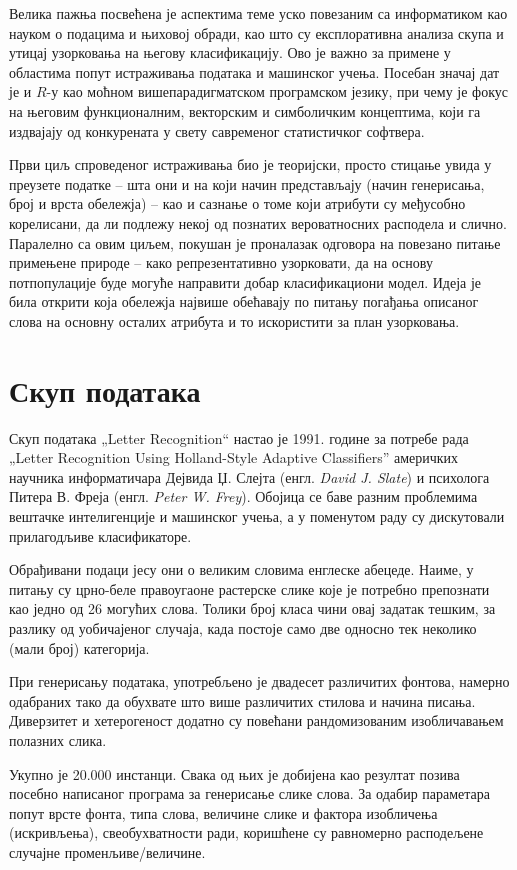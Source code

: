 \documentclass[a4paper]{article}
\begin{document}
Велика пажња посвећена је аспектима теме уско повезаним са информатиком као науком о подацима и њиховој обради, као што су експлоративна анализа скупа и утицај узорковања на његову класификацију. Ово је важно за примене у областима попут истраживања података и машинског учења. Посебан значај дат је и $R$-у као моћном вишепарадигматском програмском језику, при чему је фокус на његовим функционалним, векторским и симболичким концептима, који га издвајају од конкурената у свету савременог статистичког софтвера.

Први циљ спроведеног истраживања био је теоријски, просто стицање увида у преузете податке -- шта они и на који начин представљају (начин генерисања, број и врста обележја) -- као и сазнање о томе који атрибути су међусобно корелисани, да ли подлежу некој од познатих вероватносних расподела и слично. Паралелно са овим циљем, покушан је проналазак одговора на повезано питање примењене природе -- како репрезентативно узорковати, да на основу потпопулације буде могуће направити добар класификациони модел. Идеја је била открити која обележја највише обећавају по питању погађања описаног слова на основну осталих атрибута и то искористити за план узорковања.

\section{Скуп података}

Скуп података „Letter Recognition“ настао је 1991. године за потребе рада „Letter Recognition Using Holland-Style Adaptive Classifiers” америчких научника информатичара Дејвида Џ. Слејта (енгл. \textit{David J. Slate}) и психолога Питера В. Фреја (енгл. \textit{Peter W. Frey}). Обојица се баве разним проблемима вештачке интелигенције и машинског учења, а у поменутом раду су дискутовали прилагодљиве класификаторе.\cite{paper}

Обрађивани подаци јесу они о великим словима енглеске абецеде. Наиме, у питању су црно-беле правоугаоне растерске слике које је потребно препознати као једно од 26 могућих слова. Толики број класа чини овај задатак тешким, за разлику од уобичајеног случаја, када постоје само две односно тек неколико (мали број) категорија.

При генерисању података, употребљено је двадесет различитих фонтова, намерно одабраних тако да обухвате што више различитих стилова и начина писања. Диверзитет и хетерогеност додатно су повећани рандомизованим изобличавањем полазних слика.

Укупно је 20.000 инстанци. Свака од њих је добијена као резултат позива посебно написаног програма за генерисање слике слова. За одабир параметара попут врсте фонта, типа слова, величине слике и фактора изобличења (искривљења), свеобухватности ради, коришћене су равномерно расподељене случајне променљиве/величине.
\end{document}
